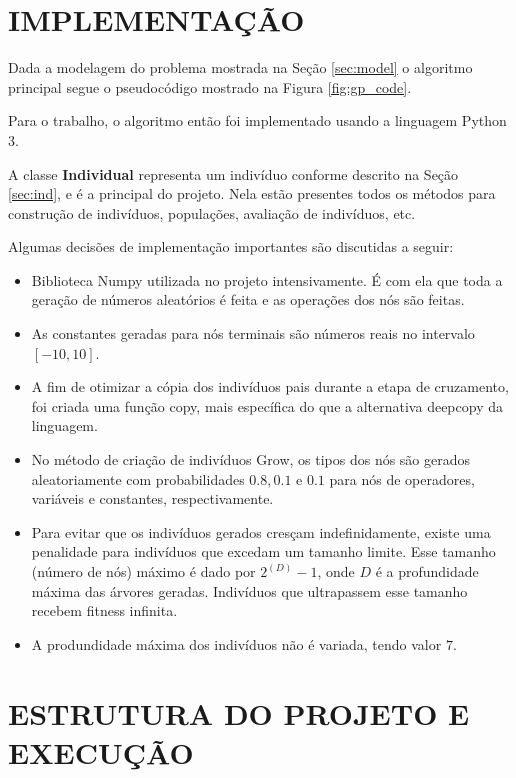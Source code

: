 \documentclass[12pt]{article}
\begin{document}
\section{IMPLEMENTAÇÃO}

Dada a modelagem do problema mostrada na Seção \ref{sec:model} o algoritmo principal
segue o pseudocódigo mostrado na Figura \ref{fig:gp_code}.

Para o trabalho, o algoritmo então foi implementado usando a linguagem Python 3.

A classe \textbf{Individual} representa um indivíduo conforme descrito na Seção
\ref{sec:ind}, e é a principal do projeto. Nela estão presentes todos os métodos 
para construção de indivíduos, populações, avaliação de indivíduos, etc.

Algumas decisões de implementação importantes são discutidas a seguir:

\begin{itemize}
 \item Biblioteca Numpy utilizada no projeto intensivamente. É com ela que toda a geração
 de números aleatórios é feita e as operações dos nós são feitas.
 
 \item As constantes geradas para nós terminais são números reais no intervalo
 $ [-10, 10] $.
 
 \item A fim de otimizar a cópia dos indivíduos pais durante a etapa de cruzamento,
 foi criada uma função copy, mais específica do que a alternativa deepcopy da linguagem.
 
 \item No método de criação de indivíduos Grow, os tipos dos nós são gerados aleatoriamente
 com probabilidades $ 0.8, 0.1 $ e $ 0.1 $ para nós de operadores, variáveis e constantes,
 respectivamente.
 
 \item Para evitar que os indivíduos gerados cresçam indefinidamente, existe uma penalidade
 para indivíduos que excedam um tamanho limite. Esse tamanho (número de nós) máximo é dado
 por $ 2^(D) - 1 $, onde $ D $ é a profundidade máxima das árvores geradas. Indivíduos que
 ultrapassem esse tamanho recebem fitness infinita.
 
 \item A produndidade máxima dos indivíduos não é variada, tendo valor $ 7 $.
\end{itemize}


\section{ESTRUTURA DO PROJETO E EXECUÇÃO}
\end{document}
